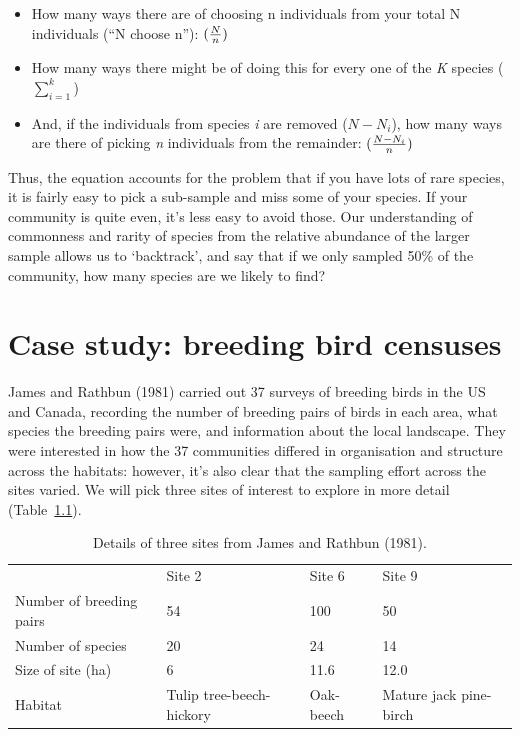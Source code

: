 \documentclass[
  letterpaper,
  DIV=11,
  numbers=noendperiod]{scrreprt}
\providecommand{\tightlist}{%
  \setlength{\itemsep}{0pt}\setlength{\parskip}{0pt}}
\begin{document}
\begin{itemize}
\tightlist
\item
  How many ways there are of choosing n individuals from your total N
  individuals (``N choose n''): \(({N \over n})\)
\item
  How many ways there might be of doing this for every one of the
  \emph{K} species (\(\sum_{i = 1}^{k}\))
\item
  And, if the individuals from species \emph{i} are removed
  (\(N - N_i\)), how many ways are there of picking \emph{n} individuals
  from the remainder: \(({N - N_i \over n})\)
\end{itemize}

Thus, the equation accounts for the problem that if you have lots of
rare species, it is fairly easy to pick a sub-sample and miss some of
your species. If your community is quite even, it's less easy to avoid
those. Our understanding of commonness and rarity of species from the
relative abundance of the larger sample allows us to `backtrack', and
say that if we only sampled 50\% of the community, how many species are
we likely to find?

\chapter{Case study: breeding bird
censuses}\label{sec-bird-survey-case-study}

James and Rathbun (1981) carried out 37 surveys of breeding birds in the
US and Canada, recording the number of breeding pairs of birds in each
area, what species the breeding pairs were, and information about the
local landscape. They were interested in how the 37 communities differed
in organisation and structure across the habitats: however, it's also
clear that the sampling effort across the sites varied. We will pick
three sites of interest to explore in more detail
(Table~\ref{tbl-bird-survey-data}).

\begin{longtable}[t]{llll}

\caption{\label{tbl-bird-survey-data}Details of three sites from James
and Rathbun (1981).}

\tabularnewline

\\
\toprule
 & Site 2 & Site 6 & Site 9\\
\midrule
Number of breeding pairs & 54 & 100 & 50\\
Number of species & 20 & 24 & 14\\
Size of site (ha) & 6 & 11.6 & 12.0\\
Habitat & Tulip tree-beech-hickory & Oak-beech & Mature jack pine-birch\\
\bottomrule

\end{longtable}
\end{document}
